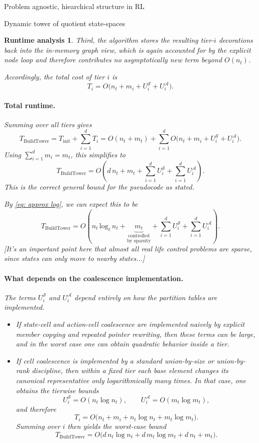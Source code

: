 \documentclass[11pt]{article}
\newtheorem{run_analysis}[subsubsection]{Runtime analysis}
\begin{document}
\begin{section}{Problem agnostic, hiearchical structure in RL}
\begin{subsection}{Dynamic tower of quotient state-spaces}
\begin{run_analysis}
Third, the algorithm stores the resulting tier-$i$ decorations back into the in-memory graph view, which is again accounted for by the explicit node loop and therefore contributes no asymptotically new term beyond $O(n_t)$.

Accordingly, the total cost of tier $i$ is
\[
T_i = O\bigl(n_t + m_i + U_i^{\mathcal S}+U_i^{\mathcal A}\bigr).
\]

\paragraph{Total runtime.}
Summing over all tiers gives
\[
T_{\mathrm{BuildTower}}
=
T_{\mathrm{init}} + \sum_{i=1}^d T_i
=
O(n_t+m_t)
+
\sum_{i=1}^d O\bigl(n_t + m_i + U_i^{\mathcal S}+U_i^{\mathcal A}\bigr).
\]
Using $\sum_{i=1}^d m_i=m_t$, this simplifies to
\[
T_{\mathrm{BuildTower}}
=
O\!\left(
d\,n_t + m_t + \sum_{i=1}^d U_i^{\mathcal S} + \sum_{i=1}^d U_i^{\mathcal A}
\right).
\]
This is the correct general bound for the pseudocode as stated.

By \eqref{eq: approx log}, we can expect this to be
\[
T_{\mathrm{BuildTower}}
=
O\!\left(
n_t\,\text{log}_{\ell}\,n_{t} + 
\!\!\!\!\!
\underset{\text{by sparsity}}{\underset{\text{controlled}}{\underbrace{m_t}}}
 + \sum_{i=1}^d U_i^{\mathcal S} + \sum_{i=1}^d U_i^{\mathcal A}
\right).
\]
[It's an important point here that almost all real life control problems are sparse, since states can only move to nearby states...]

\paragraph{What depends on the coalescence implementation.}
The terms $
U_i^{\mathcal S}$ and 
$U_i^{\mathcal A}$ depend entirely on how the partition tables are implemented.

\begin{itemize}
    \item If state-cell and action-cell coalescence are implemented naively by explicit member copying and repeated pointer rewriting, then these terms can be large, and in the worst case one can obtain quadratic behavior inside a tier.

    \item If cell coalescence is implemented by a standard union-by-size or union-by-rank discipline, then within a fixed tier each base element changes its canonical representative only logarithmically many times. In that case, one obtains the tierwise bounds
    \[
    U_i^{\mathcal S}=O(n_t\log n_t),
    \qquad
    U_i^{\mathcal A}=O(m_t\log m_t),
    \]
    and therefore
    \[
    T_i
    =
    O\bigl(n_t + m_i + n_t\log n_t + m_t\log m_t\bigr).
    \]
    Summing over $i$ then yields the worst-case bound
    \[
    T_{\mathrm{BuildTower}}
    =
    O\bigl(
    d\,n_t\log n_t + d\,m_t\log m_t + d\,n_t + m_t
    \bigr).
    \]
\end{itemize}


\end{run_analysis}
\end{subsection}
\end{section}
\end{document}

